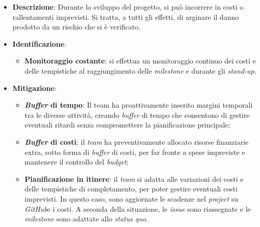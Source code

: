 \label{risk:costi e tempi imprevisti}
\begin{itemize}
	\item \textbf{Descrizione}:
	      Durante lo sviluppo del progetto, si può incorrere in costi o
	      rallentamenti imprevisti. Si tratta, a tutti gli effetti, di arginare
	      il danno prodotto da un rischio che si è verificato.
	\item \textbf{Identificazione}:
	      \begin{itemize}
		      \item \textbf{Monitoraggio costante}: si effettua un monitoraggio 
			  		continuo dei costi e delle tempistiche al raggiungimento delle 
					\textit{milestone} e durante gli \textit{stand-up}.
			  
	      \end{itemize}
	\item \textbf{Mitigazione}:
	      \begin{itemize}
		      \item \textbf{\textit{Buffer} di tempo}: Il team ha proattivamente 
			  		inserito margini temporali tra le diverse attività, creando 
					\textit{buffer} di tempo che consentono di gestire eventuali 
					ritardi senza compromettere la pianificazione principale;

		      \item \textbf{\textit{Buffer} di costi}: il \textit{team} ha 
			  		preventivamente allocato risorse finanziarie extra, 
					sotto forma di \textit{buffer} di costi, per far fronte 
					a spese impreviste e mantenere il controllo del \textit{budget};

		      \item \textbf{Pianificazione in itinere}: il \textit{team} si adatta
		            alle variazioni dei costi e delle tempistiche di
		            completamento, per poter gestire eventuali costi
		            imprevisti. In questo caso, sono aggiornate le scadenze
		            nel \textit{project} su \textit{GitHub}\g e i costi.
		            A seconda della situazione, le \textit{issue} sono
		            riassegnate e le \textit{milestone} sono adattate allo
		            \textit{status quo}.
	      \end{itemize}
\end{itemize}

